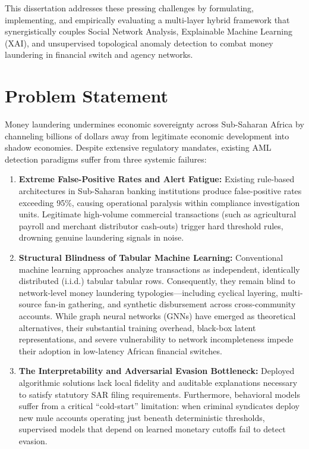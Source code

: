 This dissertation addresses these pressing challenges by formulating, implementing, and empirically evaluating a multi-layer hybrid framework that synergistically couples Social Network Analysis, Explainable Machine Learning (XAI), and unsupervised topological anomaly detection to combat money laundering in financial switch and agency networks.

\section{Problem Statement} \label{sec:problem_statement}
Money laundering undermines economic sovereignty across Sub-Saharan Africa by channeling billions of dollars away from legitimate economic development into shadow economies. Despite extensive regulatory mandates, existing AML detection paradigms suffer from three systemic failures:
\begin{enumerate}
    \item \textbf{Extreme False-Positive Rates and Alert Fatigue:} Existing rule-based architectures in Sub-Saharan banking institutions produce false-positive rates exceeding 95\%, causing operational paralysis within compliance investigation units. Legitimate high-volume commercial transactions (such as agricultural payroll and merchant distributor cash-outs) trigger hard threshold rules, drowning genuine laundering signals in noise.
    \item \textbf{Structural Blindness of Tabular Machine Learning:} Conventional machine learning approaches analyze transactions as independent, identically distributed (i.i.d.) tabular tabular rows. Consequently, they remain blind to network-level money laundering typologies---including cyclical layering, multi-source fan-in gathering, and synthetic disbursement across cross-community accounts. While graph neural networks (GNNs) have emerged as theoretical alternatives, their substantial training overhead, black-box latent representations, and severe vulnerability to network incompleteness impede their adoption in low-latency African financial switches.
    \item \textbf{The Interpretability and Adversarial Evasion Bottleneck:} Deployed algorithmic solutions lack local fidelity and auditable explanations necessary to satisfy statutory SAR filing requirements. Furthermore, behavioral models suffer from a critical ``cold-start'' limitation: when criminal syndicates deploy new mule accounts operating just beneath deterministic thresholds, supervised models that depend on learned monetary cutoffs fail to detect evasion.
\end{enumerate}

